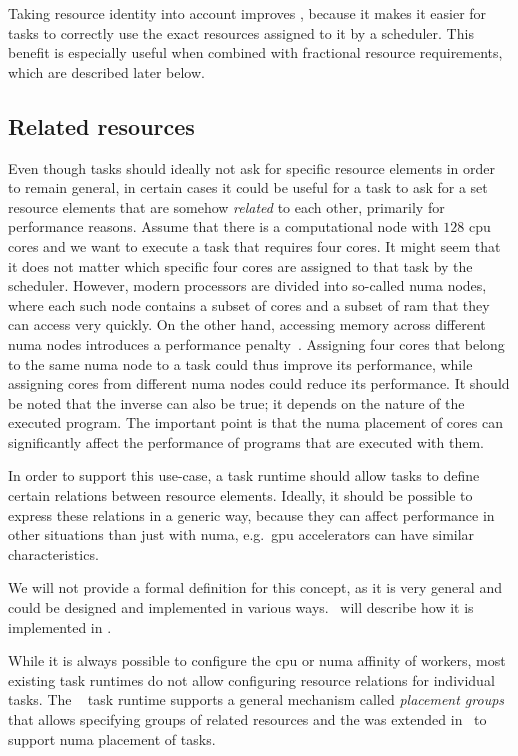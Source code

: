 Taking resource identity into account improves \ergonomics{}, because it makes it easier for
tasks to correctly use the exact resources assigned to it by a scheduler. This benefit is
especially useful when combined with fractional resource requirements, which are described later below.

\subsection{Related resources}
Even though tasks should ideally not ask for specific resource elements in order to remain
general, in certain cases it could be useful for a task to ask for a set resource elements that are
somehow \emph{related} to each other, primarily for performance reasons. Assume that there
is a computational node with $128$ \gls{cpu} cores and we want to
execute a task that requires four cores. It might seem that it does not matter which specific four
cores are assigned to that task by the scheduler. However, modern processors are divided into
so-called \gls{numa} nodes, where each such node contains a subset of cores and a
subset of \gls{ram} that they can access very quickly. On the other hand, accessing
memory across different \gls{numa} nodes introduces a performance
penalty~\cite{numa_effect}. Assigning four cores that belong to the same
\gls{numa} node to a task could thus improve its performance, while assigning cores
from different \gls{numa} nodes could reduce its performance. It should be noted that
the inverse can also be true; it depends on the nature of the executed program. The important point
is that the \gls{numa} placement of cores can significantly affect the performance of
programs that are executed with them.

In order to support this use-case, a task runtime should allow tasks to define certain relations
between resource elements. Ideally, it should be possible to express these relations in a generic
way, because they can affect performance in other situations than just with
\gls{numa}, e.g.\ \gls{gpu} accelerators can have similar
characteristics.

We will not provide a formal definition for this concept, as it is very general and could be
designed and implemented in various ways.~ will describe how it is
implemented in \hyperqueue{}.

While it is always possible to configure the \gls{cpu} or \gls{numa}
affinity of workers, most existing task runtimes do not allow configuring resource relations for
individual tasks. The \ray{}~\cite{ray} task runtime supports a
general mechanism called \emph{placement groups} that allows specifying groups of related resources
and the \pycompss{} was extended in~\cite{pycompss_numa} to support
\gls{numa} placement of tasks.

